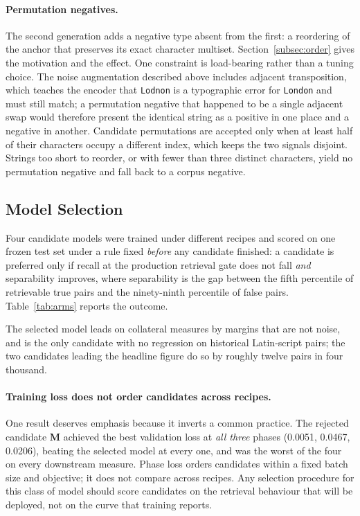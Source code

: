 \documentclass[11pt,a4paper]{article}
\begin{document}
\paragraph{Permutation negatives.} The second generation adds a negative type absent from the first: a reordering of the anchor that preserves its exact character multiset. Section~\ref{subsec:order} gives the motivation and the effect. One constraint is load-bearing rather than a tuning choice. The noise augmentation described above includes adjacent transposition, which teaches the encoder that \texttt{Lodnon} is a typographic error for \texttt{London} and must still match; a permutation negative that happened to be a single adjacent swap would therefore present the identical string as a positive in one place and a negative in another. Candidate permutations are accepted only when at least half of their characters occupy a different index, which keeps the two signals disjoint. Strings too short to reorder, or with fewer than three distinct characters, yield no permutation negative and fall back to a corpus negative.

\subsection{Model Selection}
\label{subsec:selection-model}

Four candidate models were trained under different recipes and scored on one frozen test set under a rule fixed \emph{before} any candidate finished: a candidate is preferred only if recall at the production retrieval gate does not fall \emph{and} separability improves, where separability is the gap between the fifth percentile of retrievable true pairs and the ninety-ninth percentile of false pairs. Table~\ref{tab:arms} reports the outcome.

The selected model leads on collateral measures by margins that are not noise, and is the only candidate with no regression on historical Latin-script pairs; the two candidates leading the headline figure do so by roughly twelve pairs in four thousand.

\paragraph{Training loss does not order candidates across recipes.} One result deserves emphasis because it inverts a common practice. The rejected candidate \textbf{M} achieved the best validation loss at \emph{all three} phases (0.0051, 0.0467, 0.0206), beating the selected model at every one, and was the worst of the four on every downstream measure. Phase loss orders candidates within a fixed batch size and objective; it does not compare across recipes. Any selection procedure for this class of model should score candidates on the retrieval behaviour that will be deployed, not on the curve that training reports.
\end{document}
